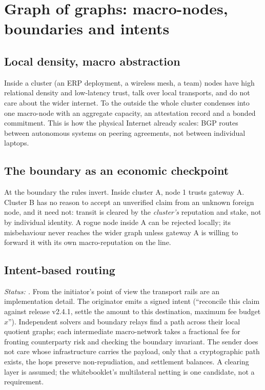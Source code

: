 \documentclass[a4paper,11pt,twoside,parskip=half-,headings=small]{scrartcl}
\begin{document}
\section{Graph of graphs: macro-nodes, boundaries and intents}
\label{sec:graphs}

\subsection{Local density, macro abstraction}
Inside a cluster (an ERP deployment, a wireless mesh, a team) nodes have high relational density
and low-latency trust, talk over local transports, and do not care about the wider internet. To the
outside the whole cluster condenses into one macro-node with an aggregate capacity, an
attestation record and a bonded commitment. This is how the physical Internet already scales:
BGP routes between autonomous systems on peering agreements, not between individual laptops.

\subsection{The boundary as an economic checkpoint}
At the boundary the rules invert. Inside cluster A, node 1 trusts gateway A. Cluster B has no
reason to accept an unverified claim from an unknown foreign node, and it need not: transit is cleared
by the \emph{cluster's} reputation and stake, not by individual identity. A rogue node inside A can be rejected
locally; its misbehaviour never reaches the wider graph unless gateway A is willing to forward it
with its own macro-reputation on the line.

\subsection{Intent-based routing}
\emph{Status: \stRes{}.} From the initiator's point of view the transport rails are an implementation
detail. The originator emits a signed intent (``reconcile this claim against release v2.4.1, settle the
amount to this destination, maximum fee budget $x$''). Independent solvers and boundary relays find a path across
their local quotient graphs; each intermediate macro-network takes a fractional fee for fronting counterparty
risk and checking the boundary invariant. The sender does not care whose infrastructure carries the payload, only
that a cryptographic path exists, the hops preserve non-repudiation, and settlement balances. A clearing layer is assumed; the whitebooklet's multilateral netting is one candidate, not a requirement.
\end{document}
